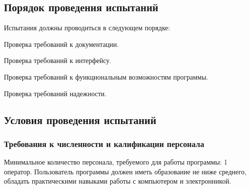 \subsection{Порядок проведения испытаний}
Испытания должны проводиться в следующем порядке:
\begin{my_enumerate}
\item Проверка требований к документации.
\item Проверка требований к интерфейсу.
\item Проверка требований к функциональным возможностям программы.
\item Проверка требований надежности.
\end{my_enumerate}


\subsection{Условия проведения испытаний}

\subsubsection{Требования к численности и калификации персонала}
Минимальное количество персонала, требуемого для работы программы: 1 оператор. Пользователь программы должен иметь образование не ниже среднего, обладать практическими навыками работы с компьютером и электронникой.


